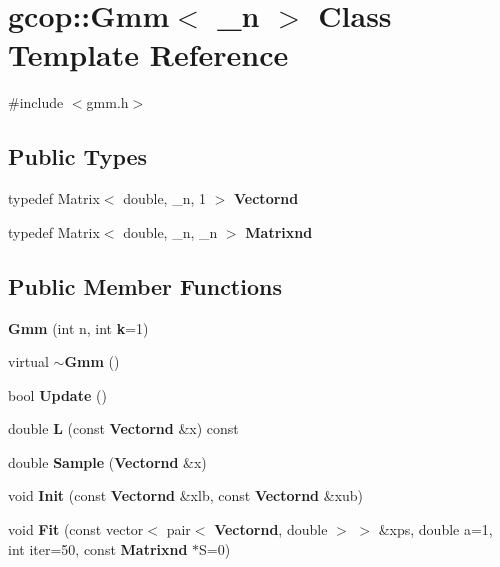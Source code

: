 \section{gcop\-:\-:\-Gmm$<$ \-\_\-n $>$ \-Class \-Template \-Reference}
\label{classgcop_1_1Gmm}


{\ttfamily \#include $<$gmm.\-h$>$}

\subsection*{\-Public \-Types}
\begin{DoxyCompactItemize}
\item 
typedef \-Matrix$<$ double, \-\_\-n, 1 $>$ {\bf \-Vectornd}
\item 
typedef \-Matrix$<$ double, \-\_\-n, \-\_\-n $>$ {\bf \-Matrixnd}
\end{DoxyCompactItemize}
\subsection*{\-Public \-Member \-Functions}
\begin{DoxyCompactItemize}
\item 
{\bf \-Gmm} (int n, int {\bf k}=1)
\item 
virtual {\bf $\sim$\-Gmm} ()
\item 
bool {\bf \-Update} ()
\item 
double {\bf \-L} (const {\bf \-Vectornd} \&x) const 
\item 
double {\bf \-Sample} ({\bf \-Vectornd} \&x)
\item 
void {\bf \-Init} (const {\bf \-Vectornd} \&xlb, const {\bf \-Vectornd} \&xub)
\item 
void {\bf \-Fit} (const vector$<$ pair$<$ {\bf \-Vectornd}, double $>$ $>$ \&xps, double a=1, int iter=50, const {\bf \-Matrixnd} $\ast$\-S=0)
\end{DoxyCompactItemize}
